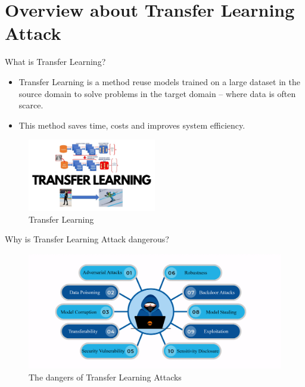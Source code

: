 
\section{Overview about Transfer Learning Attack} %


\begin{frame}{What is Transfer Learning?}
    \begin{itemize}
     \item Transfer Learning is a method reuse models trained on a large dataset in the source domain to solve problems in the target domain – where data is often scarce.
    \item This method saves time, costs and improves system efficiency.
    \end{itemize}
   \begin{figure}[h]
       \centering
       \includegraphics[width=0.5\textwidth]{img/what-is.png}
       \caption{Transfer Learning}
       \label{fig:what-is}
   \end{figure}
\end{frame}
\begin{frame}{Why is Transfer Learning Attack dangerous?}
    \begin{figure}
        \centering
        \includegraphics[width=0.8\linewidth]{img/Why.png}
        \caption{The dangers of Transfer Learning Attacks}
        \label{fig:why}
    \end{figure}

\end{frame}
